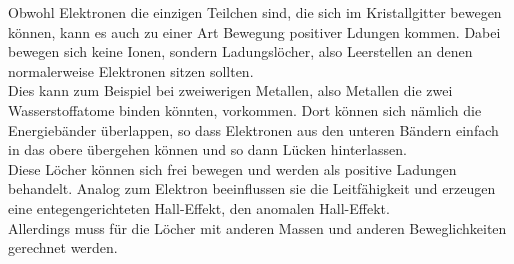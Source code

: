 Obwohl Elektronen die einzigen Teilchen sind, die sich im Kristallgitter bewegen können, kann es auch zu einer Art Bewegung positiver Ldungen kommen.
Dabei bewegen sich keine Ionen, sondern Ladungslöcher, also Leerstellen an denen normalerweise Elektronen sitzen sollten.\\
Dies kann zum Beispiel bei zweiwerigen Metallen, also Metallen die zwei Wasserstoffatome binden könnten, vorkommen.
Dort können sich nämlich die Energiebänder überlappen, so dass Elektronen aus den unteren Bändern einfach in das obere übergehen können und so 
dann Lücken hinterlassen.\\
Diese Löcher können sich frei bewegen und werden als positive Ladungen behandelt. Analog zum Elektron beeinflussen sie die Leitfähigkeit und erzeugen
eine entegengerichteten Hall-Effekt, den anomalen Hall-Effekt.\\
Allerdings muss für die Löcher mit anderen Massen und anderen Beweglichkeiten gerechnet werden.





